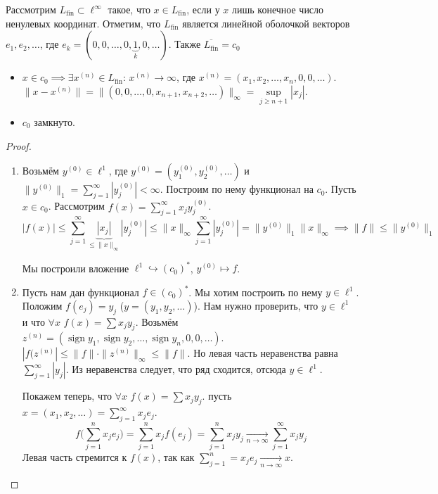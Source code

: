 \documentclass[11pt,openany,a4paper]{scrartcl}
\theoremstyle{plain}
\theoremstyle{definition}
\newcommand{\underto}[1]{\xrightarrow[#1]{}}
\DeclareMathOperator{\sign}{sign}
\begin{document}
Рассмотрим $L_\text{fin} \subset \ell^\infty$ такое, что $x \in L_\text{fin}$,
если у $x$ лишь конечное число ненулевых координат. Отметим, что $L_\text{fin}$
является линейной оболочкой векторов $e_1, e_2, \ldots$, где
$e_k = (0, 0, \ldots, 0,\underbrace{1}_{k}, 0, \ldots)$. Также
$\overline{L_\text{fin}} = c_0$
\begin{itemize}
    \item $x \in c_0 \implies \exists x^{(n)} \in L_\text{fin}$: $x^{(n)} \to 
    \infty$, где $x^{(n)} = (x_1, x_2, \ldots, x_n, 0, 0, \ldots)$.
    $\|x - x^{(n)}\| = \|(0, 0, \ldots, 0, x_{n+1}, x_{n+2}, \ldots)\|_\infty =
    \sup\limits_{j \geqslant n+1}|x_j|$.
    \item $c_0$ замкнуто.
\end{itemize}

\begin{proof}
\mbox{}
    \begin{enumerate}
        \item Возьмём $y^{(0)} \in \ell^1$, где
        $y^{(0)} = (y_1^{(0)}, y_2^{(0)}, \ldots)$
        и $\|y^{(0)}\|_1 = \sum\limits_{j=1}^\infty |y_j^{(0)}| < \infty$.
        Построим по нему функционал на $c_0$. Пусть $x \in c_0$. Рассмотрим
        $f(x) = \sum\limits_{j=1}^\infty x_jy_j^{(0)}$.
        $$
        |f(x)| \leqslant\sum\limits_{j=1}^\infty \underbrace{|x_j|}_{\leqslant \|x\|_\infty}
        |y_j^{(0)}| \leqslant \|x\|_\infty \sum\limits_{j=1}^\infty |y_j^{(0)}| =
        \|y^{(0)}\|_1 \|x\|_\infty \implies
        \|f\| \leqslant \|y^{(0)}\|_1
        $$
        
        Мы построили вложение $\ell^1 \hookrightarrow (c_0)^\ast$, $y^{(0)} 
        \mapsto f$.
        \item Пусть нам дан функционал $f \in (c_0)^\ast$. Мы хотим построить по
        нему $y \in \ell^1$. Положим $f(e_j) = y_j$ ($y = (y_1, y_2, \ldots)$).
        Нам нужно проверить, что $y \in \ell^1$ и что
        $\forall x$ $f(x) = \sum x_jy_j$.
        Возьмём $z^{(n)} =
        (\sign y_1, \sign y_2, \ldots, \sign y_n, 0, 0,\ldots)$.
        $|f(z^{(n)}| \leqslant \|f\|\cdot \|z^{(n)}\|_\infty \leqslant \|f\|$.
        Но левая часть неравенства равна $\sum\limits_{j=1}^\infty |y_j|$. Из
        неравенства следует, что ряд сходится, отсюда $y \in \ell^1$.
        
        Покажем теперь, что $\forall x$ $f(x) = \sum x_jy_j$.
        пусть $x = (x_1, x_2, \ldots) = \sum\limits_{j=1}^\infty x_je_j$.
        $$
        f\bigg(\sum\limits_{j=1}^n x_je_j\bigg) = \sum\limits_{j=1}^n x_jf(e_j) =
        \sum\limits_{j=1}^n x_jy_j \underto{n \to \infty} \sum\limits_{j=1}^\infty
        x_jy_j
        $$
        Левая часть стремится к $f(x)$, так как $\sum\limits_{j=1}^n = x_je_j
        \underto{n \to \infty} x$.
    \end{enumerate}
\end{proof}
\end{document}
